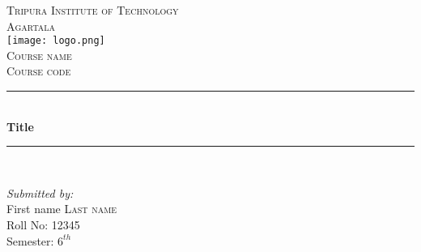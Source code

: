 \documentclass[12pt]{article}
\begin{document}
\begin{titlepage}

\newcommand{\HRule}{\rule{\linewidth}{0.5mm}} %

\center %
 
\textsc{\LARGE Tripura Institute of Technology}\\ [0.5cm]%
\textsc{\LARGE Agartala}\\[1.5cm]
\texttt{[image: logo.png]}\\[1cm] %
\textsc{\Large Course name}\\[0.5cm] %
\textsc{\large Course code}\\[0.5cm] %


\HRule \\[0.4cm]
{ \huge \bfseries Title}\\[0.4cm] %
\HRule \\[1.5cm]
 

\begin{minipage}{0.4\textwidth}
\begin{flushleft} \large
\emph{Submitted by:}\\
First name \textsc{Last name}\\ %
Roll No: \textsc{12345}\\
Semester: \textsc{$6^{th}$}
\end{flushleft}

\end{minipage}\\[2cm]

\vfill %

\end{titlepage}
\end{document}
